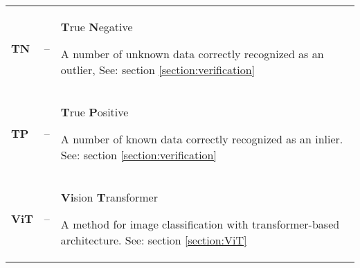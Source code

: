 {\begin{longtable}{>{\bfseries}l l p{}}
        TN
        &–&
        \textbf{T}rue \textbf{N}egative
        \par
        \small
        A number of unknown data correctly recognized as an outlier,
        \newline
        See: section \ref{section:verification}
        \\

        TP
        &–&
        \textbf{T}rue \textbf{P}ositive
        \par
        \small
        A number of known data correctly recognized as an inlier.
        \newline
        See: section \ref{section:verification}
        \\

        ViT
        &–&
        \textbf{Vi}sion \textbf{T}ransformer
        \par
        \small
        A method for image classification with transformer-based architecture.
        \newline
        See: section \ref{section:ViT}
        \\
    \end{longtable}
}
